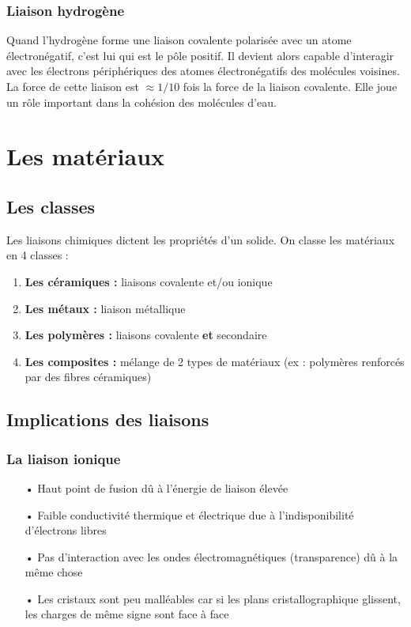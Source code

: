 		\subsubsection{Liaison hydrogène}
			Quand l'hydrogène forme une liaison covalente polarisée avec un atome électronégatif, c'est lui qui est le pôle positif. Il devient alors capable d'interagir avec les électrons périphériques des atomes électronégatifs des molécules voisines. \\
			La force de cette liaison est $\approx 1/10$ fois la force de la liaison covalente. Elle joue un rôle important dans la cohésion des molécules d'eau.
			
\section{Les matériaux}
	\subsection{Les classes}
		Les liaisons chimiques dictent les propriétés d'un solide. On classe les matériaux en 4 classes :
	
		\begin{enumerate}
			\item \textbf{Les céramiques :} liaisons covalente et/ou ionique
			\item \textbf{Les métaux :} liaison métallique
			\item \textbf{Les polymères :} liaisons covalente \textbf{et} secondaire
			\item \textbf{Les composites :} mélange de 2 types de matériaux (ex : polymères renforcés par des fibres céramiques)
		\end{enumerate}	 
	
	\subsection{Implications des liaisons}
		\subsubsection{La liaison ionique}
			\begin{itemize}
				\item[•] Haut point de fusion dû à l'énergie de liaison élevée
				\item[•] Faible conductivité thermique et électrique due à l'indisponibilité d'électrons libres
				\item[•] Pas d'interaction avec les ondes électromagnétiques (transparence) dû à la même chose
				\item[•] Les cristaux sont peu malléables car si les plans cristallographique glissent, les charges de même signe sont face à face
			\end{itemize}					
			
